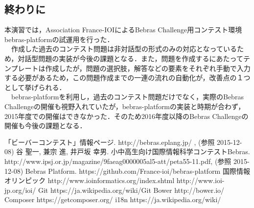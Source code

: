 \documentclass[a4paper]{jarticle}
\begin{document}
\begin{multicols}{2}
\section{終わりに}
本演習では，Association France-IOIによるBebras Challenge用コンテスト環境bebras-platformの試運用を行った．
\\　作成した過去のコンテスト問題は非対話型の形式のみの対応となっているため，対話型問題の実装が今後の課題となる．また，問題を作成するにあたってテンプレートは作成したが，問題の選択肢，解答などの要素をそれぞれ手動で入力する必要があるため，この問題作成までの一連の流れの自動化が，改善点の１つとして挙げられる．
\\　bebras-platformを利用し，過去のコンテスト問題だけでなく，実際のBebras Challengeの開催も視野入れていたが，bebras-platformの実装と時期が合わず，2015年度での開催はできなかった．そのため2016年度以降のBebras Challengeの開催も今後の課題となる．

\end{multicols}

\begin{thebibliography}{1}

 「ビーバーコンテスト」情報ページ.  http://bebras.eplang.jp/ , (参照 2015-12-08)
 谷 聖一, 兼宗 進, 井戸坂 幸男. 小中高生向け国際情報科学コンテストBebras.  http://www.ipsj.or.jp/magazine/9faeag0000005al5-att/peta55-11.pdf, (参照 2015-12-08)
 Bebras Platform. https://github.com/France-ioi/bebras-platform
 国際情報オリンピック http://www.ioinformatics.org/index.shtml   http://www.ioi-jp.org/ioi/
 Git  https://ja.wikipedia.org/wiki/Git
Bower  http://bower.io/
Composer  https://getcomposer.org/
i18n  https://ja.wikipedia.org/wiki/%



\end{thebibliography}
\end{document}
